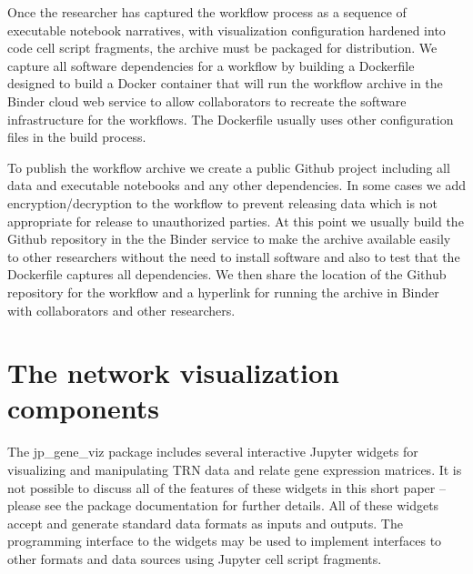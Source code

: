 \documentclass[10pt,letterpaper]{article}
\begin{document}
Once the researcher has captured the workflow process as a sequence of executable notebook 
narratives, with visualization configuration hardened into code cell script fragments, 
the archive must be packaged for distribution.  We capture all software dependencies 
for a workflow by building a Dockerfile designed to build a Docker container \cite{docker} 
that will run the workflow archive in the Binder cloud web service \cite{binder} to
allow collaborators to recreate the software infrastructure for the workflows.  The Dockerfile 
usually uses other configuration files in the build process.

To publish the workflow archive we create a public Github project including all data 
and executable notebooks and any other dependencies.  In some cases we add encryption/decryption 
to the workflow to prevent releasing data which is not appropriate for 
release to unauthorized parties.  At this point we usually build the Github repository 
in the the Binder service \cite{binder} to make the archive available easily to other 
researchers without the need to install software and also to test that the Dockerfile captures all dependencies.  
We then share the location of the Github repository for the workflow and a hyperlink 
for running the archive in Binder with collaborators and other researchers. 

\section{The network visualization components}

The jp\_gene\_viz package includes several interactive Jupyter widgets 
for visualizing and manipulating TRN data and relate gene expression matrices.  
It is not possible to discuss all of the features of these widgets in this short paper -- 
please see the package documentation for further details.  All of these widgets accept and generate 
standard data formats as inputs and outputs.
The programming interface to the widgets may be used to implement interfaces
to other formats and data sources using Jupyter cell script fragments.
\end{document}
